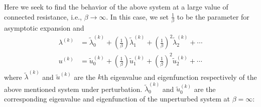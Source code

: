 \documentclass{article}
\begin{document}
Here we seek to find the behavior of the above system at a large value of connected resistance, i.e., $\beta \to \infty$. In this case, we set $\frac{1}{\beta}$ to be the parameter for asymptotic expansion and 
\begin{equation}
    \begin{aligned}
        \lambda^{(k)} &= \tilde\lambda_0^{(k)} + \left( \frac{1}{\beta} \right) \tilde\lambda_1^{(k)} + \left( \frac{1}{\beta} \right)^2 \tilde\lambda_2^{(k)} + \cdots \\
        u^{(k)} &= \tilde{u}_0^{(k)} + \left( \frac{1}{\beta} \right) \tilde{u}_1^{(k)} + \left( \frac{1}{\beta} \right)^2 \tilde{u}_2^{(k)} + \cdots
    \end{aligned}
\end{equation}
where $\tilde\lambda^{(k)}$ and $\tilde{u}^{(k)}$ are the $k$th eigenvalue and eigenfunction respectively of the above mentioned system under perturbation. $\tilde{\lambda}_0^{(k)}$ and $\tilde{u}_0^{(k)}$ are the corresponding eigenvalue and eigenfunction of the unperturbed system at $\beta = \infty$:
\end{document}
